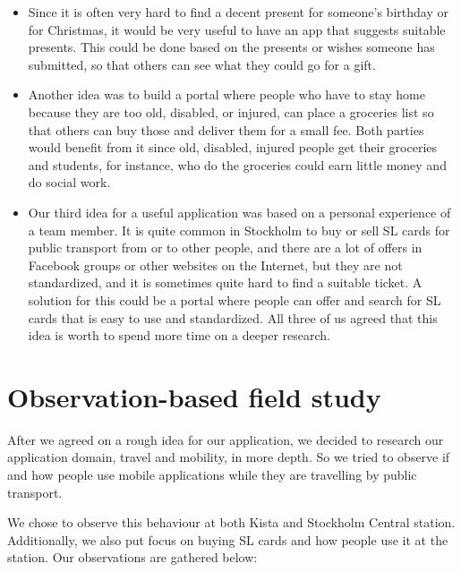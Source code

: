 \documentclass[11pt,twoside,a4paper]{report}
\begin{document}
\begin{itemize}
	\item Since it is often very hard to find a decent present for someone's birthday or for Christmas, it would be very useful to have an app that suggests suitable presents. This could be done based on the presents or wishes someone has submitted, so that others can see what they could go for a gift.
	\item Another idea was to build a portal where people who have to stay home because they are too old, disabled, or injured, can place a groceries list so that others can buy those and deliver them for a small fee. Both parties would benefit from it since old, disabled, injured people get their groceries and students, for instance, who do the groceries could earn little money and do social work.
	\item Our third idea for a useful application was based on a personal experience of a team member. It is quite common in Stockholm to buy or sell SL cards for public transport from or to other people, and there are a lot of offers in Facebook groups or other websites on the Internet, but they are not standardized, and it is sometimes quite hard to find a suitable ticket. A solution for this could be a portal where people can offer and search for SL cards that is easy to use and standardized. All three of us agreed that this idea is worth to spend more time on a deeper research.
\end{itemize}

\section{Observation-based field study}

After we agreed on a rough idea for our application, we decided to research our application domain, travel and mobility, in more depth. So we tried to observe if and how people use mobile applications while they are travelling by public transport.

We chose to observe this behaviour at both Kista and Stockholm Central station. Additionally, we also put focus on buying SL cards and how people use it at the station. Our observations are gathered below:
\end{document}
